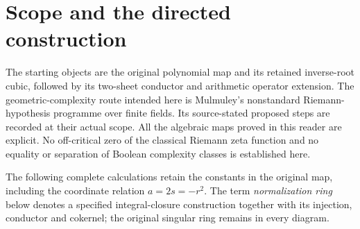 \section{Scope and the directed construction}
The starting objects are the original polynomial map and its retained
inverse-root cubic, followed by its two-sheet conductor and arithmetic
operator extension. The geometric-complexity route intended here is
Mulmuley's nonstandard Riemann-hypothesis programme over finite fields.
Its source-stated proposed steps are recorded at their actual scope.
All the algebraic maps proved in this reader are explicit. No off-critical
zero of the classical Riemann zeta function and no equality or separation
of Boolean complexity classes is established here.

The following complete calculations retain the constants in the original
map, including the coordinate relation $a=2s=-r^2$. The term
\emph{normalization ring} below denotes a specified integral-closure
construction together with its injection, conductor and cokernel;
the original singular ring remains in every diagram.





























